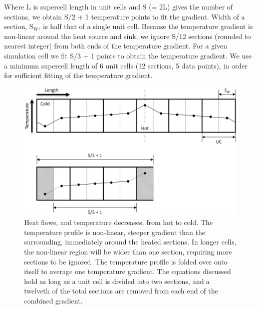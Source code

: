 Where L is supercell length in unit cells and S (= 2L) gives the number of sections, we obtain S/2 + 1 temperature points to fit the gradient. Width of a section, S$_{\mathrm{W}}$, is half that of a single unit cell. Because the temperature gradient is non-linear around the heat source and sink, we ignore S/12 sections (rounded to nearest integer) from both ends of the temperature gradient. For a given simulation cell we fit S/3 + 1 points to obtain the temperature gradient. We use a minimum supercell length of 6 unit cells (12 sections, 5 data points), in order for sufficient fitting of the temperature gradient. 



\begin{figure}[h!]
\includegraphics[width=\linewidth]{Figures/direct_temp_pro_03.png}
\caption[direct temperature profile 3]{Heat flows, and temperature decreases, from hot to cold. The temperature profile is non-linear, steeper gradient than the surrounding, immediately around the heated sections. In longer cells, the non-linear region will be wider than one section, requiring more sections to be ignored. The temperature profile is folded over onto itself to average one temperature gradient. The equations discussed hold as long as a unit cell is divided into two sections, and a twelveth of the total sections are removed from each end of the combined gradient.}
\label{fig:direct_temp_pro_03}
\end{figure}

